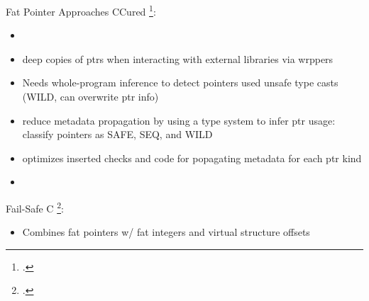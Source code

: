 \documentclass[aspectratio=169]{beamer}
\begin{document}
\begin{frame}{Fat Pointer Approaches}
CCured \footcite{necula_ccured:_2002}:
\begin{itemize}
    \item {}
    \item deep copies of ptrs when interacting with external libraries via wrppers
    \item Needs whole-program inference to detect pointers used unsafe type casts (WILD, can overwrite ptr info)
    \item reduce metadata propagation by using a type system to infer ptr usage: classify pointers as SAFE, SEQ, and WILD
    \item optimizes inserted checks and code for popagating metadata for each ptr kind
    \item {}
\end{itemize}
\vspace{0.1in}


Fail-Safe C \footcite{oiwa_implementation_2009}:
\begin{itemize}
    \item Combines fat pointers w/ fat integers and virtual structure offsets
\end{itemize}

\end{frame}
\end{document}
